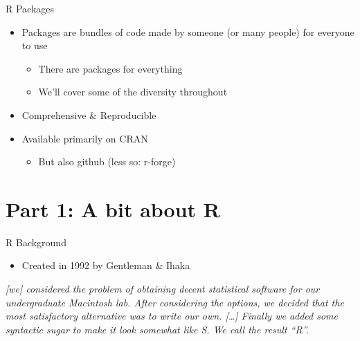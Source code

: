 \documentclass[
  ignorenonframetext,
]{beamer}
\providecommand{\tightlist}{%
  \setlength{\itemsep}{0pt}\setlength{\parskip}{0pt}}
\begin{document}
\begin{frame}{R Packages}
\protect\hypertarget{r-packages}{}

\begin{itemize}
\tightlist
\item
  Packages are bundles of code made by someone (or many people) for
  everyone to use

  \begin{itemize}
  \tightlist
  \item
    There are packages for everything
  \item
    We'll cover some of the diversity throughout
  \end{itemize}
\item
  Comprehensive \& Reproducible
\item
  Available primarily on CRAN

  \begin{itemize}
  \tightlist
  \item
    But also github (less so: r-forge)
  \end{itemize}
\end{itemize}

\end{frame}

\hypertarget{part-1-a-bit-about-r}{%
\section{Part 1: A bit about R}\label{part-1-a-bit-about-r}}

\begin{frame}{R Background}
\protect\hypertarget{r-background}{}

\begin{itemize}
\tightlist
\item
  Created in 1992 by Gentleman \& Ihaka
\end{itemize}

\emph{{[}we{]} considered the problem of obtaining decent statistical
software for our undergraduate Macintosh lab. After considering the
options, we decided that the most satisfactory alternative was to write
our own. {[}\ldots{}{]} Finally we added some syntactic sugar to make it
look somewhat like S. We call the result ``R''.}

\end{frame}
\end{document}
